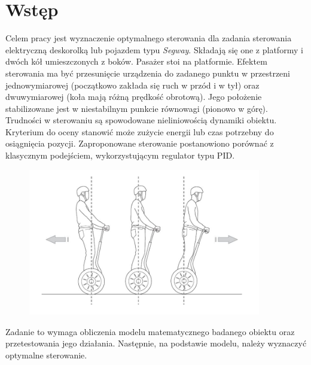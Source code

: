 \section{Wstęp}
\label{sec:wstep}

Celem pracy jest wyznaczenie optymalnego sterowania dla zadania sterowania elektryczną deskorolką lub pojazdem typu \textit{Segway}. Składają się one z platformy i dwóch kół umieszczonych z boków. Pasażer stoi na platformie. Efektem sterowania ma być przesunięcie urządzenia do zadanego punktu w przestrzeni jednowymiarowej (początkowo zakłada się ruch w przód i w tył) oraz dwuwymiarowej (koła mają różną prędkość obrotową). Jego położenie stabilizowane jest w niestabilnym punkcie równowagi (pionowo w górę). Trudności w sterowaniu są spowodowane nieliniowością dynamiki obiektu. Kryterium do oceny stanowić może zużycie energii lub czas potrzebny do osiągnięcia pozycji. Zaproponowane sterowanie postanowiono porównać z klasycznym podejściem, wykorzystującym regulator typu PID.

\begin{figure}[h]
	\centering
	\includegraphics[width=4in]{Figures/wstep_segway.jpg}
	\label{fig:wstep_segway}
\end{figure}

Zadanie to wymaga obliczenia modelu matematycznego badanego obiektu oraz przetestowania jego działania. Następnie, na podstawie modelu, należy wyznaczyć optymalne sterowanie.